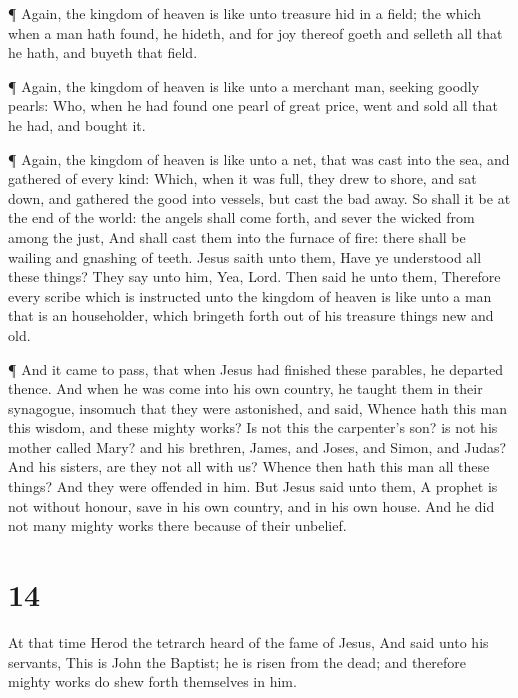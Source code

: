  ¶ Again, the kingdom of heaven is like unto treasure hid
in a field; the which when a man hath found, he hideth, and for joy
thereof goeth and selleth all that he hath, and buyeth that field.

 ¶ Again, the kingdom of heaven is like unto a merchant
man, seeking goodly pearls:  Who, when he had found one
pearl of great price, went and sold all that he had, and bought it.

 ¶ Again, the kingdom of heaven is like unto a net, that
was cast into the sea, and gathered of every kind:  Which,
when it was full, they drew to shore, and sat down, and gathered the
good into vessels, but cast the bad away.  So shall it be
at the end of the world: the angels shall come forth, and sever the
wicked from among the just,  And shall cast them into the
furnace of fire: there shall be wailing and gnashing of teeth.
 Jesus saith unto them, Have ye understood all these
things? They say unto him, Yea, Lord.  Then said he unto
them, Therefore every scribe which is instructed unto the kingdom of
heaven is like unto a man that is an householder, which bringeth forth
out of his treasure things new and old.

 ¶ And it came to pass, that when Jesus had finished these
parables, he departed thence.  And when he was come into
his own country, he taught them in their synagogue, insomuch that they
were astonished, and said, Whence hath this man this wisdom, and these
mighty works?  Is not this the carpenter's son? is not his
mother called Mary? and his brethren, James, and Joses, and Simon, and
Judas?  And his sisters, are they not all with us? Whence
then hath this man all these things?  And they were
offended in him. But Jesus said unto them, A prophet is not without
honour, save in his own country, and in his own house.  And
he did not many mighty works there because of their unbelief.

\hypertarget{section-13}{%
\section{14}\label{section-13}}

 At that time Herod the tetrarch heard of the fame of Jesus,
 And said unto his servants, This is John the Baptist; he is
risen from the dead; and therefore mighty works do shew forth themselves
in him.

